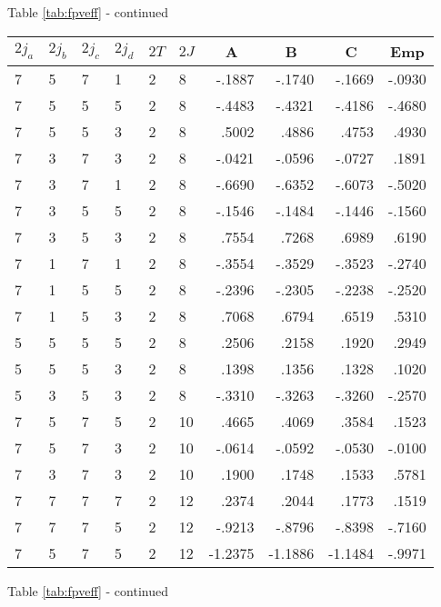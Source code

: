 \begin{center}{Table \ref{tab:fpveff} - continued}\end{center}
\clearpage
\small
\begin{center}
\begin{tabular}{llllllrrrr}
\hline
$2j_{a}$&$2j_{b}$&$2j_{c}$&$2j_{d}$&$2T$&$2J$&
\multicolumn{1}{c}{A}&
\multicolumn{1}{c}{B}&
\multicolumn{1}{c}{C}&
\multicolumn{1}{c}{Emp}
\\\hline
  7& 5& 7& 1& 2& 8&  -.1887&  -.1740&  -.1669&  -.0930\\
  7& 5& 5& 5& 2& 8&  -.4483&  -.4321&  -.4186&  -.4680\\
  7& 5& 5& 3& 2& 8&   .5002&   .4886&   .4753&   .4930\\
  7& 3& 7& 3& 2& 8&  -.0421&  -.0596&  -.0727&   .1891\\
  7& 3& 7& 1& 2& 8&  -.6690&  -.6352&  -.6073&  -.5020\\
  7& 3& 5& 5& 2& 8&  -.1546&  -.1484&  -.1446&  -.1560\\
  7& 3& 5& 3& 2& 8&   .7554&   .7268&   .6989&   .6190\\
  7& 1& 7& 1& 2& 8&  -.3554&  -.3529&  -.3523&  -.2740\\
  7& 1& 5& 5& 2& 8&  -.2396&  -.2305&  -.2238&  -.2520\\
  7& 1& 5& 3& 2& 8&   .7068&   .6794&   .6519&   .5310\\
  5& 5& 5& 5& 2& 8&   .2506&   .2158&   .1920&   .2949\\
  5& 5& 5& 3& 2& 8&   .1398&   .1356&   .1328&   .1020\\
  5& 3& 5& 3& 2& 8&  -.3310&  -.3263&  -.3260&  -.2570\\
  7& 5& 7& 5& 2&10&   .4665&   .4069&   .3584&   .1523\\
  7& 5& 7& 3& 2&10&  -.0614&  -.0592&  -.0530&  -.0100\\
  7& 3& 7& 3& 2&10&   .1900&   .1748&   .1533&   .5781\\
  7& 7& 7& 7& 2&12&   .2374&   .2044&   .1773&   .1519\\
  7& 7& 7& 5& 2&12&  -.9213&  -.8796&  -.8398&  -.7160\\
  7& 5& 7& 5& 2&12& -1.2375& -1.1886& -1.1484&  -.9971\\
\hline
\end{tabular}
\end{center}
\begin{center}{Table \ref{tab:fpveff} - continued}\end{center}
\clearpage

